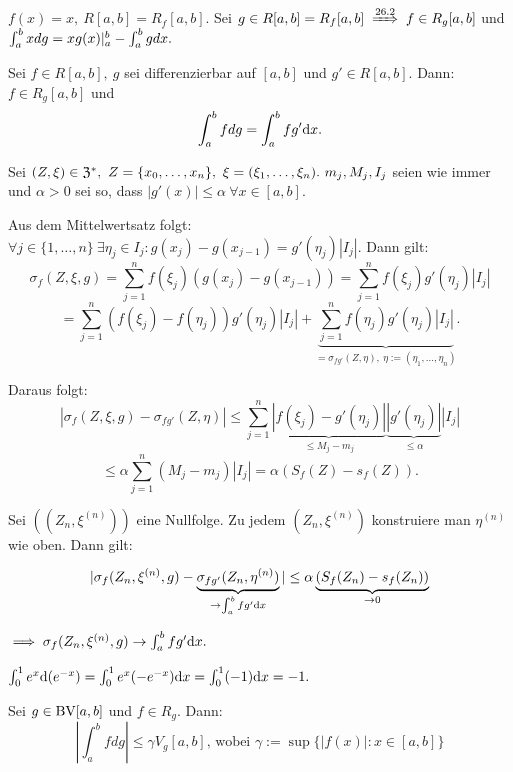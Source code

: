 \documentclass[a4paper,twoside,DIV15,BCOR12mm]{scrbook}
\begin{document}
\begin{beispiel}
$f(x) = x,\ R[a,b] = R_f[a,b].$ Sei $g \in R[a,b] = R_f[a,b] \folgtnach{26.2} f \in R_g[a,b]$ und $\intab* xdg = xg(x)|_a^b - \intab* gdx.$
\end{beispiel}

\begin{satz}
Sei $f \in R[a,b],\ g$ sei differenzierbar auf $[a,b]$ und $g' \in R[a,b].$ Dann: $f \in R_g[a,b]$ und $$\intab* fdg = \intab* fg'\dx.$$
\end{satz}

\begin{beweis}
Sei $(Z,\xi) \in \mathfrak{Z}^*,\ Z = \{x_0,\ldots,x_n\},\ \xi = (\xi_1,\ldots,\xi_n).\ m_j,M_j,I_j$ seien wie immer und $\alpha > 0$ sei so, dass $|g'(x)| \le \alpha\ \forall x \in [a,b].$

Aus dem Mittelwertsatz folgt: $\forall j \in \{1,\ldots,n\}\ \exists \eta_j \in I_j: g(x_j) - g(x_{j-1}) = g'(\eta_j) |I_j|.$ Dann gilt:
$$\sigma_f(Z,\xi,g) = \sum_{j=1}^nf(\xi_j)(g(x_j) - g(x_{j-1})) = \sum_{j=1}^n f(\xi_j)g'(\eta_j) |I_j|$$
$$= \sum_{j=1}^n (f(\xi_j) - f(\eta_j))g'(\eta_j) |I_j| + \underbrace{\sum_{j=1}^n f(\eta_j)g'(\eta_j) |I_j|}_{= \sigma_{fg'}(Z,\eta),\ \eta := (\eta_1,\ldots,\eta_n)}.$$

Daraus folgt:
$$|\sigma_f(Z,\xi,g) - \sigma_{fg'}(Z,\eta)| \le \sum_{j=1}^n \underbrace{|f(\xi_j) - g'(\eta_j)|}_{\le M_j - m_j} \underbrace{|g'(\eta_j)|}_{\le \alpha} |I_j|$$
$$\le \alpha \sum_{j=1}^n (M_j - m_j) |I_j| = \alpha (S_f(Z) - s_f(Z)).$$

Sei $((Z_n,\xi^{(n)}))$ eine Nullfolge. Zu jedem $(Z_n,\xi^{(n)})$ konstruiere man $\eta^{(n)}$ wie oben. Dann gilt:

$$|\sigma_f(Z_n,\xi^{(n)},g) - \underbrace{\sigma_{fg'}(Z_n,\eta^{(n)})}_{\to \intab* fg'\dx}| \le \alpha \underbrace{(S_f(Z_n) - s_f(Z_n))}_{\to 0}$$

$\folgt \sigma_f(Z_n,\xi^{(n)},g) \to \intab* fg'\dx.$
\end{beweis}

\begin{beispiel}
$\int_0^1 e^x \text{d}(e^{-x}) = \int_0^1 e^x(-e^{-x})\text{d}x = \int_0^1 (-1)\text{d}x = -1.$
\end{beispiel}

\begin{satz}
Sei $g \in \text{BV}[a,b]$ und $f \in R_{g}$. Dann: $${\left|\int_a^b fdg\right|}\le\gamma V_g[a,b]\text{, wobei }\gamma:=\sup\{|f(x)|: x \in [a,b]\}$$ $ $
\end{satz}
\end{document}
